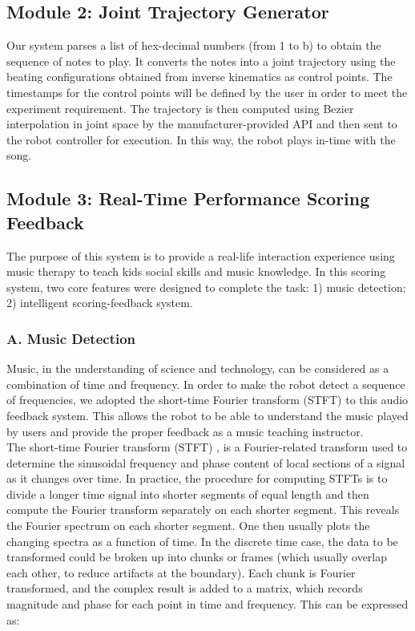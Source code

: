 \subsection{Module 2: Joint Trajectory Generator}
Our system parses a list of hex-decimal numbers (from 1 to b) to obtain the sequence
of notes to play. It converts the notes into a joint trajectory using the beating
configurations obtained from inverse kinematics as control points. The timestamps
for the control points will be defined by the user in order to meet the experiment requirement.
The trajectory is then computed using Bezier interpolation in joint space by the
manufacturer-provided API and then sent to the robot controller for execution. In this
way, the robot plays in-time with the song.\\

\subsection{Module 3: Real-Time Performance Scoring Feedback}
The purpose of this system is to provide a real-life interaction experience using 
music therapy to teach kids social skills and music knowledge.  In this scoring 
system, two core features were designed to complete the task: 1) music detection;
2) intelligent scoring-feedback system.\\


\subsubsection{A. Music Detection}
Music, in the understanding of science and technology, can be considered as a combination 
of time and frequency. In order to make the robot detect a sequence of frequencies, we adopted the 
short-time Fourier transform (STFT) to this audio feedback system. This allows the robot to 
be able to understand the music played by users and provide the proper feedback as
a music teaching instructor.\\

The short-time Fourier transform (STFT) , is a Fourier-related transform used to 
determine the sinusoidal frequency and phase content of local sections of a signal 
as it changes over time. In practice, the procedure for computing STFTs is to divide 
a longer time signal into shorter segments of equal length and then compute the 
Fourier transform separately on each shorter segment. This reveals the Fourier 
spectrum on each shorter segment. One then usually plots the changing spectra as 
a function of time. In the discrete time case, the data to be transformed could 
be broken up into chunks or frames (which usually overlap each other, to reduce 
artifacts at the boundary). Each chunk is Fourier transformed, and the complex 
result is added to a matrix, which records magnitude and phase for each point in 
time and frequency. This can be expressed as:
\\


